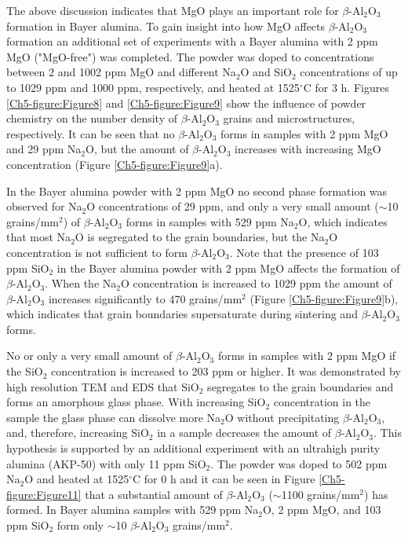 The above discussion indicates that MgO plays an important role for $\beta$-Al$_{2}$O$_{3}$ formation in Bayer alumina. To gain insight into how MgO affects $\beta$-Al$_{2}$O$_{3}$ formation an additional set of experiments with a Bayer alumina with 2 ppm MgO ("MgO-free") was completed. The powder was doped to concentrations between 2 and 1002 ppm MgO and different Na$_{2}$O and SiO$_{2}$ concentrations of up to 1029 ppm and 1000 ppm, respectively, and heated at 1525$^{\circ}$C for 3 h. Figures \ref{Ch5-figure:Figure8} and \ref{Ch5-figure:Figure9} show the influence of powder chemistry on the number density of $\beta$-Al$_{2}$O$_{3}$ grains and microstructures, respectively. It can be seen that no $\beta$-Al$_{2}$O$_{3}$ forms in samples with 2 ppm MgO and 29 ppm Na$_{2}$O, but the amount of $\beta$-Al$_{2}$O$_{3}$ increases with increasing MgO concentration (Figure \ref{Ch5-figure:Figure9}a). 

In the Bayer alumina powder with 2 ppm MgO no second phase formation was observed for Na$_{2}$O concentrations of 29 ppm, and only a very small amount ($\sim$10 grains/mm$^{2}$) of $\beta$-Al$_{2}$O$_{3}$ forms in samples with 529 ppm Na$_{2}$O, which indicates that most Na$_{2}$O is segregated to the grain boundaries, but the Na$_{2}$O concentration is not sufficient to form $\beta$-Al$_{2}$O$_{3}$. Note that the presence of 103 ppm SiO$_{2}$ in the Bayer alumina powder with 2 ppm MgO affects the formation of $\beta$-Al$_{2}$O$_{3}$. When the Na$_{2}$O concentration is increased to 1029 ppm the amount of $\beta$-Al$_{2}$O$_{3}$ increases significantly to 470 grains/mm$^{2}$ (Figure \ref{Ch5-figure:Figure9}b), which indicates that grain boundaries supersaturate during sintering and $\beta$-Al$_{2}$O$_{3}$ forms. 

No or only a very small amount of $\beta$-Al$_{2}$O$_{3}$ forms in samples with 2 ppm MgO if the SiO$_{2}$ concentration is increased to 203 ppm or higher. It was demonstrated by high resolution TEM and EDS that SiO$_{2}$ segregates to the grain boundaries and forms an amorphous glass phase. With increasing SiO$_{2}$ concentration in the sample the glass phase can dissolve more Na$_{2}$O without precipitating $\beta$-Al$_{2}$O$_{3}$, and, therefore, increasing SiO$_{2}$ in a sample decreases the amount of $\beta$-Al$_{2}$O$_{3}$. This hypothesis is supported by an additional experiment with an ultrahigh purity alumina (AKP-50) with only 11 ppm SiO$_{2}$. The powder was doped to 502 ppm Na$_{2}$O and heated at 1525$^{\circ}$C for 0 h and it can be seen in Figure \ref{Ch5-figure:Figure11} that a substantial amount of $\beta$-Al$_{2}$O$_{3}$ ($\sim$1100 grains/mm$^{2}$) has formed. In Bayer alumina samples with 529 ppm Na$_{2}$O, 2 ppm MgO, and 103 ppm SiO$_{2}$ form only $\sim$10 $\beta$-Al$_{2}$O$_{3}$ grains/mm$^{2}$. 

